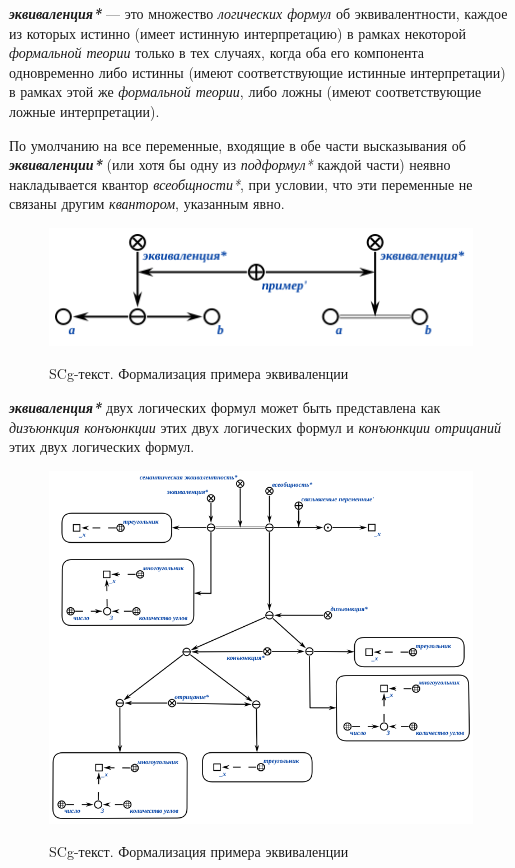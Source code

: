\textbf{\textit{эквиваленция*}} --- это множество \textit{логических формул} об эквивалентности, каждое из которых истинно (имеет истинную интерпретацию) в рамках некоторой \textit{формальной теории} только в тех случаях, когда оба его компонента одновременно либо истинны (имеют соответствующие истинные интерпретации) в рамках этой же \textit{формальной теории}, либо ложны (имеют соответствующие ложные интерпретации).

По умолчанию на все переменные, входящие в обе части высказывания об \textbf{\textit{эквиваленции*}} (или хотя бы одну из \textit{подформул*} каждой части) неявно накладывается квантор \textit{всеобщности*}, при условии, что эти переменные не связаны другим \textit{квантором}, указанным явно.

\begin{figure}[H]
	\caption{SCg-текст. Формализация примера эквиваленции}
	\includegraphics[scale=0.8]{author/part2/figures/logic/equivalent.png}
	\label{fig:equivalent}
\end{figure}

\textbf{\textit{эквиваленция*}} двух логических формул может быть представлена как \textit{дизъюнкция} \textit{конъюнкции} этих двух логических формул и \textit{конъюнкции} \textit{отрицаний} этих двух логических формул.

\begin{figure}[H]
	\caption{SCg-текст. Формализация примера эквиваленции}
	\includegraphics[scale=0.8]{author/part2/figures/logic/equivalence_representation.png}
	\label{fig:equivalence_representation}
\end{figure}

